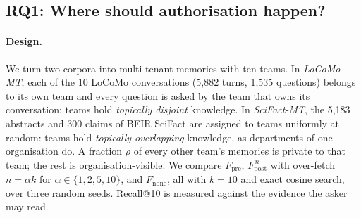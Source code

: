 \documentclass[11pt,a4paper]{article}
\theoremstyle{remark}
\begin{document}
\subsection{RQ1: Where should authorisation happen?}
\label{sec:rq1}

\paragraph{Design.} We turn two corpora into multi-tenant memories with ten teams. In \emph{LoCoMo-MT}, each of the
10 LoCoMo conversations (5{,}882 turns, 1{,}535 questions) belongs to its own team and every question is asked by the team
that owns its conversation: teams hold \emph{topically disjoint} knowledge. In \emph{SciFact-MT}, the 5{,}183 abstracts
and 300 claims of BEIR SciFact are assigned to teams uniformly at random: teams hold \emph{topically overlapping}
knowledge, as departments of one organisation do. A fraction $\rho$ of every other team's memories is private to that
team; the rest is organisation-visible. We compare $F_{\mathrm{pre}}$, $F_{\mathrm{post}}^{\,n}$ with over-fetch
$n=\alpha k$ for $\alpha\in\{1,2,5,10\}$, and $F_{\mathrm{none}}$, all with $k=10$ and exact cosine search, over three
random seeds. Recall@10 is measured against the evidence the asker may read.
\end{document}
